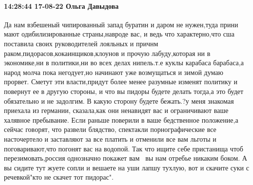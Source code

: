  
 
 
 
 

\paragraph{14:28:44 17-08-22 Ольга Давыдова}

Да нам взбешеный чипированный запад буратин и даром не нужен,туда прини мают
одибилизированные страны,навроде вас, и ведь что характерно,что сша поставила
своих руководителей лояльных и причнм раком,пидорасов,кокаинщиков,клоунов и
прочую лабуду,которая ни в экономике,ни в политики,ни во всех делах нипель.т.е
куклы карабаса барабаса,а народ молча пока негодует,но начинают уже возмущаться
и зимой думаю прорвет. Сметут эти власти,придут более менее разумные изменят
политику и повернут ее в другую стороны, и что вы пидоры будете делать тогда,а
это будет обязательно и не задолгим. В какую сторону будете бежать.?у меня
знакомая приехала из германии, сказала,как они ненавидят вас и ограничивают
ваше халявное пребывание. Если раньше поверили в ваше бедственное положение,а
сейчас говорят, что развели блядство, спектакли порнографические все
насточертело и заставляют за все платить и отменили все вам льготы и
поговаривают,что погонят вас на водопой. Так что ищите  себе пристанища чтоб
перезимовать,россия однозначно покажет вам💪💪💪вы нам отребье никаким боком. А
вы сидите тут жуете сопли и вешаете на уши лапшу тухлую, вот и скачите суки с
речевкой"кто не скачет тот пидорас".
